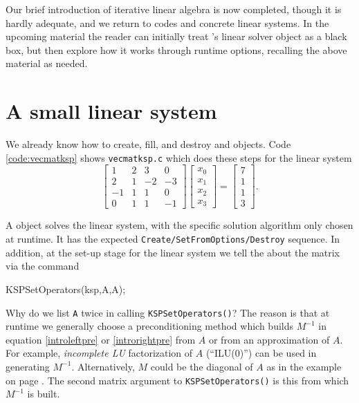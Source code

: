Our brief introduction of iterative linear algebra is now completed, though it is hardly adequate, and we return to \PETSc codes and concrete linear systems.  In the upcoming material the reader can initially treat \PETSc's \pKSP linear solver object as a black box, but then explore how it works through runtime options, recalling the above material as needed.


\section{A small linear system}

We already know how to create, fill, and destroy \pVec and \pMat objects.  Code \ref{code:vecmatksp} shows \texttt{vecmatksp.c} which does these steps for the linear system
\begin{equation}
\begin{bmatrix} 1 & 2 & 3 & 0 \\
                2 & 1 &-2 &-3 \\
               -1 & 1 & 1 & 0 \\
                0 & 1 & 1 &-1 \end{bmatrix}
\begin{bmatrix} x_0 \\ x_1 \\ x_2 \\ x_3 \end{bmatrix}
=
\begin{bmatrix} 7 \\ 1 \\ 1 \\ 3 \end{bmatrix}.
\end{equation}

A \pKSP object solves the linear system, with the specific solution algorithm only chosen at runtime.  It has the expected \texttt{Create/SetFromOptions/Destroy} sequence.  In addition, at the set-up stage for the linear system we tell the \pKSP about the matrix via the command
\begin{code}
KSPSetOperators(ksp,A,A);
\end{code}

Why do we list \texttt{A} twice in calling \texttt{KSPSetOperators()}?  The reason is that at runtime we generally choose a preconditioning method which builds $M^{-1}$ in equation \eqref{introleftpre} or \eqref{introrightpre} from $A$ or from an approximation of $A$.  For example, \emph{incomplete LU} factorization of $A$ (``ILU($0$)'') can be used in generating $M^{-1}$.  Alternatively, $M$ could be the diagonal of $A$ as in the example on page \pageref{example:ls:jacobirichardson}.  The second matrix argument to \texttt{KSPSetOperators()} is this \pMat from which $M^{-1}$ is built.

